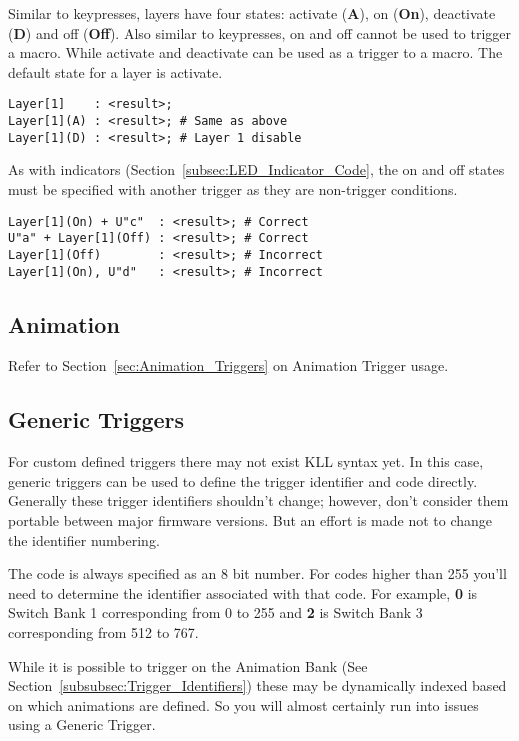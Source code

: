 \documentclass{kiibohd-template}
\begin{document}
Similar to keypresses, layers have four states: activate (\textbf{A}), on (\textbf{On}), deactivate (\textbf{D}) and off (\textbf{Off}).
Also similar to keypresses, on and off cannot be used to trigger a macro.
While activate and deactivate can be used as a trigger to a macro.
The default state for a layer is activate.

\begin{lstlisting}
Layer[1]    : <result>;
Layer[1](A) : <result>; # Same as above
Layer[1](D) : <result>; # Layer 1 disable
\end{lstlisting}

As with indicators (Section~\ref{subsec:LED_Indicator_Code}, the on and off states must be specified with another trigger as they are non-trigger conditions.

\begin{lstlisting}
Layer[1](On) + U"c"  : <result>; # Correct
U"a" + Layer[1](Off) : <result>; # Correct
Layer[1](Off)        : <result>; # Incorrect
Layer[1](On), U"d"   : <result>; # Incorrect
\end{lstlisting}


\subsection{Animation}

Refer to Section~\ref{sec:Animation_Triggers} on Animation Trigger usage.


\subsection{Generic Triggers}

For custom defined triggers there may not exist KLL syntax yet.
In this case, generic triggers can be used to define the trigger identifier and code directly.
Generally these trigger identifiers shouldn't change; however, don't consider them portable between major firmware versions.
But an effort is made not to change the identifier numbering.

The code is always specified as an 8 bit number.
For codes higher than 255 you'll need to determine the identifier associated with that code.
For example, \textbf{0} is Switch Bank 1 corresponding from 0 to 255 and \textbf{2} is Switch Bank 3 corresponding from 512 to 767.

While it is possible to trigger on the Animation Bank (See Section~\ref{subsubsec:Trigger_Identifiers}) these may be dynamically indexed based on which animations are defined.
So you will almost certainly run into issues using a Generic Trigger.
\end{document}
